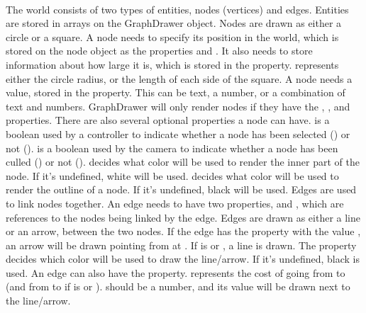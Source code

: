 \\[11pt]
The world consists of two types of entities, nodes (vertices) and edges. Entities are stored in arrays on the GraphDrawer object. Nodes are drawn as either a circle or a square. A node needs to specify its position in the world, which is stored on the node object as the properties  and . It also needs to store information about how large it is, which is stored in the  property.  represents either the circle radius, or the length of each side of the square. A node needs a value, stored in the  property. This can be text, a number, or a combination of text and numbers. GraphDrawer will only render nodes if they have the , ,  and  properties. There are also several optional properties a node can have.  is a boolean used by a controller to indicate whether a node has been selected () or not ().  is a boolean used by the camera to indicate whether a node has been culled () or not ().  decides what color will be used to render the inner part of the node. If it's undefined, white will be used.  decides  what color will be used to render the outline of a node. If it's undefined, black will be used. Edges are used to link nodes together. An edge needs to have two properties,  and , which are references to the nodes being linked by the edge. Edges are drawn as either a line or an arrow, between the two nodes. If the edge has the property  with the value , an arrow will be drawn pointing from  at . If  is  or , a line is drawn. The  property decides which color will be used to draw the line/arrow. If it's undefined, black is used. An edge can also have the  property.  represents the cost of going from  to  (and from  to  if  is  or ).  should be a number, and its value will be drawn next to the line/arrow.
\\[11pt]
